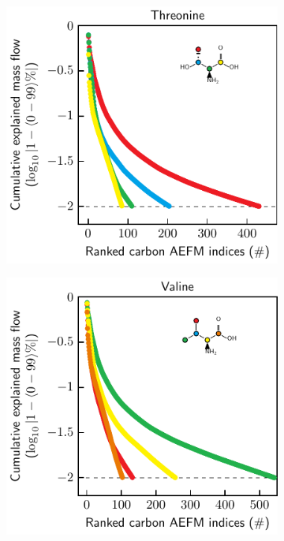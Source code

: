 \documentclass[]{article}
\begin{document}
\begin{figure}
    \begin{subfigure}[t]{0.247\textwidth}
        \caption{}
        \includegraphics[width=\textwidth]{subpanels/cumulative-source-met-35-log.pdf}\\
    \end{subfigure}
    \begin{subfigure}[t]{0.247\textwidth}
        \caption{}
        \includegraphics[width=\textwidth]{subpanels/cumulative-source-met-40-log.pdf}\\
    \end{subfigure}

\end{figure}
\end{document}
